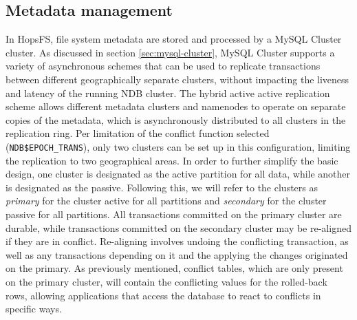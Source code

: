 \subsection{Metadata management}
In HopsFS, file system metadata are stored and processed by a MySQL Cluster cluster.
As discussed in section \ref{sec:mysql-cluster}, MySQL Cluster supports a variety of asynchronous schemes that can be used to replicate transactions between different geographically separate clusters, without impacting the liveness and latency of the running NDB cluster.
The hybrid active active replication scheme allows different metadata clusters and namenodes to operate on separate copies of the metadata, which is asynchronously distributed to all clusters in the replication ring.
Per limitation of the conflict function selected (\texttt{NDB\$EPOCH\_TRANS}), only two clusters can be set up in this configuration, limiting the replication to two geographical areas.
In order to further simplify the basic design, one cluster is designated as the active partition for all data, while another is designated as the passive.
Following this, we will refer to the clusters as \emph{primary} for the cluster active for all partitions and \emph{secondary} for the cluster passive for all partitions. 
All transactions committed on the primary cluster are durable, while transactions committed on the secondary cluster may be re-aligned if they are in conflict.
Re-aligning involves undoing the conflicting transaction, as well as any transactions depending on it and the applying the changes originated on the primary.
As previously mentioned, conflict tables, which are only present on the primary cluster, will contain the conflicting values for the rolled-back rows, allowing applications that access the database to react to conflicts in specific ways.

